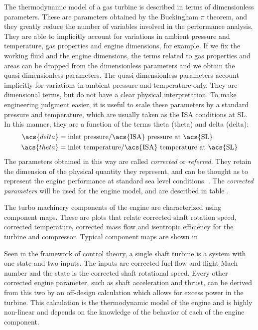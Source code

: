 The thermodynamic model of a gas turbine is described in terms of dimensionless parameters.%
These are parameters obtained by the Buckingham $\pi$ theorem, 
 and they greatly reduce the number of variables involved in the performance analysis.
 They are able to implicitly account for variations in ambient pressure and temperature, 
 gas properties and engine dimensions, for example.
If we fix the working fluid and the engine dimensions, the terms related to gas properties and areas can be dropped from the dimensionless parameters and we obtain the quasi-dimensionless parameters.
The quasi-dimensionless parameters account implicitly for variations in ambient pressure and temperature only.
They are dimensional terms, but do not have a clear physical interpretation. 
To make engineering judgment easier, it is useful to scale these parameters by 
 a standard pressure and temperature, which are usually taken as the 
 \gls{ISA} conditions at \gls{SL}. 
In this manner, they are a function of the terms theta (\acs{theta}) and delta (\acs{delta}):
\begin{align}
    \acs{delta} &= \text{inlet pressure}/\text{\acs{ISA} pressure at \acs{SL}} \\
    \acs{theta} &= \text{inlet temperature}/\text{\acs{ISA} temperature at \acs{SL}}
\end{align}
The parameters obtained in this way are called \emph{corrected} or \emph{referred}.
They retain the dimension of the physical quantity they represent, 
 and can be thought as to represent the engine performance at standard sea level conditions.
\cite{walsh2004gas}. 
The \emph{corrected parameters} will be used for the engine model,
 and are described in table .
 
The turbo machinery components of the engine are characterized using component maps.%
 These are plots that relate corrected shaft rotation speed, corrected temperature,
 corrected mass flow and isentropic efficiency for the turbine and compressor.
Typical component maps are shown in 

Seen in the framework of control theory,
 a single shaft turbine is a system with one state and two inputs.
 The inputs are corrected fuel flow and flight Mach number 
 and the state is the corrected shaft rotational speed.
 Every other corrected engine parameter, such as shaft acceleration and thrust,
 can be derived from this two by an off-design calculation
 which allows for excess power in the turbine.
This calculation is the thermodynamic model of the engine and is highly non-linear and depends on the knowledge of the behavior of each of the engine component.

